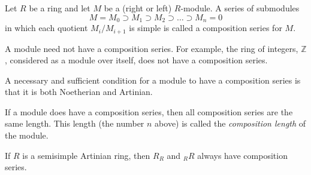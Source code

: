 \documentclass[12pt]{article}
\begin{document}
Let $R$ be a ring and let $M$ be a (right or left) $R$-module.
A series of submodules
$$M = M_0 \supset M_1 \supset M_2 \supset \dots \supset M_n = 0$$
in which each quotient $M_i/M_{i+1}$ is simple is called a composition series for $M$.

A module need not have a composition series.  For example, the ring of integers, $\mathbb{Z}$, considered as a module over itself, does not have a composition series.

A necessary and sufficient condition for a module to have a composition series is that it is both Noetherian and Artinian.

If a module does have a composition series, then all composition series are the same length.
This length (the number $n$ above) is called the \emph{composition length} of the module.

If $R$ is a semisimple Artinian ring, then $R_R$ and ${}_RR$ always have composition series.
\end{document}
